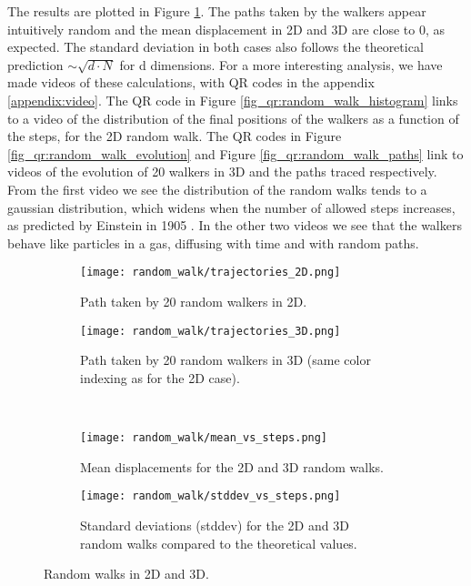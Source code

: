 The results are plotted in Figure \ref{fig:random_walk}. The paths taken by the walkers appear intuitively random and the mean displacement in 2D and 3D are close to 0, as expected. The standard deviation in both cases also follows the theoretical prediction $\sim \sqrt{d\cdot N}$ for d dimensions. For a more interesting analysis, we have made videos of these calculations, with QR codes in the appendix \ref{appendix:video}. The QR code in Figure \ref{fig_qr:random_walk_histogram} links to a video of the distribution of the final positions of the walkers as a function of the steps, for the 2D random walk. The QR codes in Figure \ref{fig_qr:random_walk_evolution} and Figure \ref{fig_qr:random_walk_paths} link to videos of the evolution of 20 walkers in 3D and the paths traced respectively. From the first video we see the distribution of the random walks tends to a gaussian distribution, which widens when the number of allowed steps increases, as predicted by Einstein in 1905 \cite{Einstein_random-walk}. In the other two videos we see that the walkers behave like particles in a gas, diffusing with time and with random paths.

    \begin{figure}[H]
        \centering
        \begin{subfigure}[t]{0.48\textwidth}
            \texttt{[image: random\_walk/trajectories\_2D.png]}
            \caption{Path taken by 20 random walkers in 2D.}
        \end{subfigure}
        \begin{subfigure}[t]{0.48\textwidth}
            \texttt{[image: random\_walk/trajectories\_3D.png]}
            \caption{Path taken by 20 random walkers in 3D (same color indexing as for the 2D case).}
        \end{subfigure}
        \\
        \begin{subfigure}[t]{0.48\textwidth}
            \texttt{[image: random\_walk/mean\_vs\_steps.png]}
            \caption{Mean displacements for the 2D and 3D random walks.}
        \end{subfigure}
        \begin{subfigure}[t]{0.48\textwidth}
            \texttt{[image: random\_walk/stddev\_vs\_steps.png]}
            \caption{Standard deviations (stddev) for the 2D and 3D random walks compared to the theoretical values.}
        \end{subfigure}
        \caption{Random walks in 2D and 3D.}
        \label{fig:random_walk}
    \end{figure}

